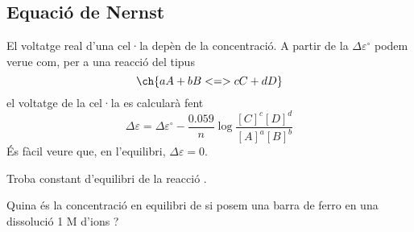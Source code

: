 \subsection{Equació de Nernst}

El voltatge real d'una cel·la depèn de la concentració.
A partir de la $\Delta \varepsilon^{\circ}$ podem verue com, per a una reacció del tipus 
\[\ch{a A + b B <=> c C + d D}\]
el voltatge de la cel·la es calcularà fent
\[\Delta \varepsilon=\Delta \varepsilon^{\circ}-\frac{0.059}{n} \log \frac{[C]^c[D]^d}{[A]^a[B]^b}\] 
És fàcil veure que, en l'equilibri, $\Delta \varepsilon=0$.

\begin{exr}
Troba constant d'equilibri de la reacció .
\end{exr}

\begin{exr}
Quina és la concentració en equilibri de  si posem una barra de ferro en una dissolució 1 M d'ions ?
\end{exr}

